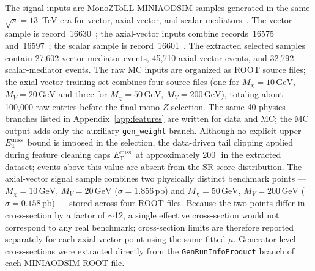 \documentclass[11pt,a4paper,twocolumn]{article}
\newcommand{\GeV}{\text{GeV}}
\newcommand{\MET}{\ensuremath{E_{\mathrm{T}}^{\mathrm{miss}}}}
\begin{document}
The signal inputs are MonoZToLL MINIAODSIM samples generated in the same
$\sqrt{s}=13$~TeV era for vector, axial-vector, and scalar mediators~\cite{DMForum2015}.
The vector sample is record~16630~\cite{CERNOpenDataMonoZVector}; the axial-vector inputs
combine records~16575 and~16597~\cite{CERNOpenDataMonoZAxialMx10Mv20,CERNOpenDataMonoZAxialMx50Mv200};
the scalar sample is record~16601~\cite{CERNOpenDataMonoZScalar}.
The extracted selected samples contain 27,602 vector-mediator events, 45,710 axial-vector
events, and 32,792 scalar-mediator events.
The raw MC inputs are organized as ROOT source files; the axial-vector
training set combines four source files (one for \(M_\chi=10\,\GeV\),
\(M_V=20\,\GeV\) and three for \(M_\chi=50\,\GeV\), \(M_V=200\,\GeV\)),
totaling about 100,000 raw entries before the final mono-$Z$ selection. The same
40 physics branches listed in Appendix~\ref{app:features} are written for data and MC; the
MC output adds only the auxiliary \texttt{gen\_weight} branch.
Although no explicit upper \MET\ bound is imposed in the selection,
the data-driven tail clipping applied during feature cleaning caps
\MET\ at approximately 200\,\GeV\ in the extracted dataset; events
above this value are absent from the SR score distribution.
The axial-vector signal sample combines two physically distinct
benchmark points --- $M_\chi=10\,\GeV$, $M_V=20\,\GeV$ ($\sigma=1.856\,\mathrm{pb}$)
and $M_\chi=50\,\GeV$, $M_V=200\,\GeV$ ($\sigma=0.158\,\mathrm{pb}$) ---
stored across four ROOT files. Because the two points differ in cross-section
by a factor of $\sim$12, a single effective cross-section would not correspond
to any real benchmark; cross-section limits are therefore reported separately
for each axial-vector point using the same fitted $\mu$.
Generator-level cross-sections were extracted directly from the
\texttt{GenRunInfoProduct} branch of each MINIAODSIM ROOT file.
\end{document}
